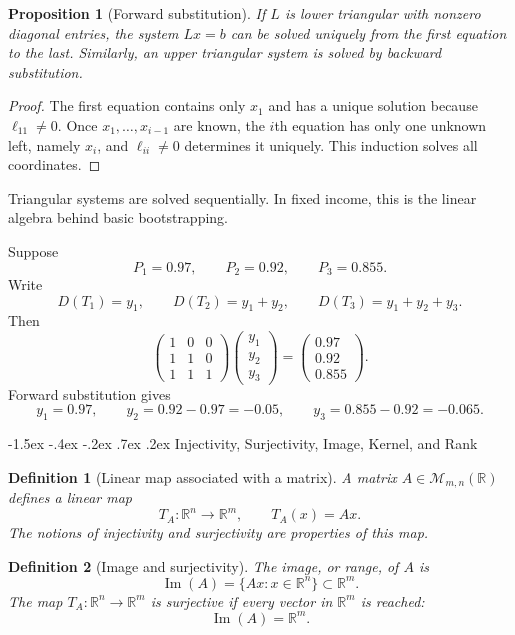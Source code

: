 \documentclass[10pt]{article}
\makeatletter
\renewcommand\section{\@startsection{section}{1}{\z@}%
  {-1.5ex \@plus -.4ex \@minus -.2ex}%
  {.7ex \@plus .2ex}%
  {\normalfont\large\bfseries}}
\theoremstyle{compactdefinition}
\newtheorem{definition}{Definition}[section]
\theoremstyle{compactproposition}
\newtheorem{proposition}{Proposition}[section]
\newcommand{\R}{\mathbb{R}}
\newcommand{\M}{\mathcal{M}}
\newcommand{\im}{\operatorname{Im}}
\makeatother
\begin{document}
\begin{proposition}[Forward substitution]
If $L$ is lower triangular with nonzero diagonal entries, the system $Lx=b$ can
be solved uniquely from the first equation to the last. Similarly, an upper
triangular system is solved by backward substitution.
\end{proposition}

\begin{proof}
The first equation contains only $x_1$ and has a unique solution because
$\ell_{11}\neq0$. Once $x_1,\ldots,x_{i-1}$ are known, the $i$th equation has
only one unknown left, namely $x_i$, and $\ell_{ii}\neq0$ determines it
uniquely. This induction solves all coordinates.
\end{proof}

Triangular systems are solved sequentially. In fixed income, this is the linear
algebra behind basic bootstrapping.

Suppose
\[
P_1=0.97,\qquad P_2=0.92,\qquad P_3=0.855.
\]
Write
\[
D(T_1)=y_1,\qquad D(T_2)=y_1+y_2,\qquad D(T_3)=y_1+y_2+y_3.
\]
Then
\[
\begin{pmatrix}
1&0&0\\
1&1&0\\
1&1&1
\end{pmatrix}
\begin{pmatrix}y_1\\y_2\\y_3\end{pmatrix}
=
\begin{pmatrix}0.97\\0.92\\0.855\end{pmatrix}.
\]
Forward substitution gives
\[
y_1=0.97,\qquad y_2=0.92-0.97=-0.05,\qquad
y_3=0.855-0.92=-0.065.
\]

\section{Injectivity, Surjectivity, Image, Kernel, and Rank}

\begin{definition}[Linear map associated with a matrix]
A matrix $A\in\M_{m,n}(\R)$ defines a linear map
\[
T_A:\R^n\to\R^m,
\qquad
T_A(x)=Ax.
\]
The notions of injectivity and surjectivity are properties of this map.
\end{definition}

\begin{definition}[Image and surjectivity]
The image, or range, of $A$ is
\[
\im(A)=\{Ax:x\in\R^n\}\subset\R^m.
\]
The map $T_A:\R^n\to\R^m$ is surjective if every vector in $\R^m$ is reached:
\[
\im(A)=\R^m.
\]
\end{definition}
\end{document}
